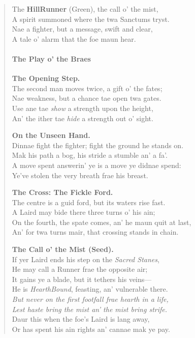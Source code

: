 \documentclass[11pt]{article}
\begin{document}
\begin{quote}
The \textbf{Hill\textendash Runner} (Green), the call o' the mist,\\
A spirit summoned where the twa Sanctums tryst.\\
Nae a fighter, but a message, swift and clear,\\
A tale o' alarm that the foe maun hear.

\paragraph{The Play o' the Braes}
\textbf{The Opening Step.}\\
The second man moves twice, a gift o' the fates;\\
Nae weakness, but a chance tae open twa gates.\\
Use ane tae \emph{show} a strength upon the height,\\
An' the ither tae \emph{hide} a strength out o' sight.

\textbf{On the Unseen Hand.}\\
Dinnae fight the fighter; fight the ground he stands on.\\
Mak his path a bog, his stride a stumble an' a fa'.\\
A move spent answerin' ye is a move ye didnae spend:\\
Ye've stolen the very breath frae his breast.

\textbf{The Cross: The Fickle Ford.}\\
The centre is a guid ford, but its waters rise fast.\\
A Laird may bide there three turns o' his ain;\\
On the fourth, the spate comes, an' he maun quit at last,\\
An' for twa turns mair, that crossing stands in chain.

\textbf{The Call o' the Mist (Seed).}\\
If yer Laird ends his step on the \emph{Sacred Stanes},\\
He may call a Runner frae the opposite air;\\
It gains ye a blade, but it tethers his veins—\\
He is \emph{Hearth\textendash Bound}, feasting, an' vulnerable there.\\
\emph{But never on the first footfall frae hearth in a life,}\\
\emph{Lest haste bring the mist an' the mist bring strife.}\\
Daur this when the foe's Laird is lang away,\\
Or has spent his ain rights an' cannae mak ye pay.


\end{quote}
\end{document}
